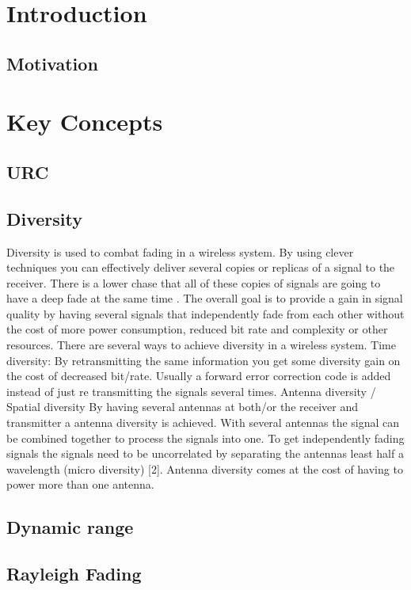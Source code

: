 \chapter{Introduction}
\section{Motivation}


\chapter{Key Concepts}
\section{URC}
\section{Diversity}
Diversity is used to combat fading in a wireless system. By using clever techniques you can effectively deliver several copies or replicas of a signal to the receiver. There is a lower chase that all of these copies of signals are going to have a deep fade at the same time \citep[p. 4-6]{diversityFuture}. The overall goal is to provide a gain in signal quality by having several signals that independently fade from each other without the cost of more power consumption, reduced bit rate and complexity or other resources. There are several ways to achieve diversity in a wireless system. 
Time diversity: By retransmitting the same information you get some diversity gain on the cost of decreased bit/rate. Usually a forward error correction code is added instead of just re transmitting the signals several times.
Antenna diversity / Spatial diversity
By having several antennas at both/or the receiver and transmitter a antenna diversity is achieved. With several antennas the signal can be combined together to process the signals into one. To get independently fading signals the signals need to be uncorrelated by separating the antennas least half a wavelength (micro diversity) [2]. Antenna diversity comes at the cost of having to power more than one antenna.


\section{Dynamic range}
\section{Rayleigh Fading}
